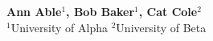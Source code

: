 \makeatletter
\textbf{%
  Ann Able$^{1}$,
  Bob Baker$^{1}$,
  Cat Cole$^{2}$} \\
$^{1}$University of Alpha \qquad $^{2}$University of Beta
\makeatother
